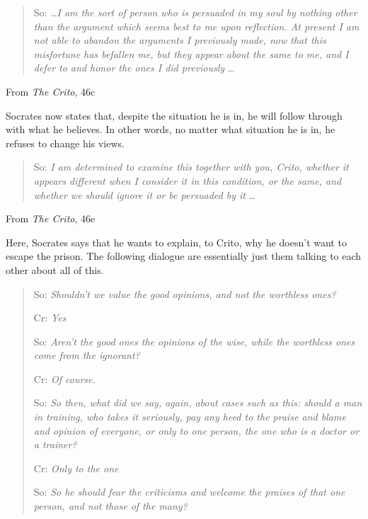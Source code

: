 \documentclass[letterpaper]{article}
\begin{document}
\begin{itemize}
    \begin{mdframed}[]
        \begin{quotation}
            So: \dots \emph{I am the sort of person who is persuaded in my soul by nothing other than the argument which seems best to me upon reflection. At present I am not able to abandon the arguments I previously made, now that this misfortune has befallen me, but they appear about the same to me, and I defer to and honor the ones I did previously} \dots
        \end{quotation}
        From \emph{The Crito}, 46c
    \end{mdframed}
    Socrates now states that, despite the situation he is in, he will follow through with what he believes. In other words, no matter what situation he is in, he refuses to change his views. 

    \begin{mdframed}[]
        \begin{quotation}
            So: \emph{I am determined to examine this together with you, Crito, whether it appears different when I consider it in this condition, or the same, and whether we should ignore it or be persuaded by it} \dots
        \end{quotation}
        From \emph{The Crito}, 46e
    \end{mdframed}
    Here, Socrates says that he wants to explain, to Crito, why he doesn't want to escape the prison. The following dialogue are essentially just them talking to each other about all of this. 

    \begin{mdframed}[]
        \begin{quotation}
            So: \emph{Shouldn't we value the good opinions, and not the worthless ones?} 
            
            Cr: \emph{Yes}

            So: \emph{Aren't the good ones the opinions of the wise, while the worthless ones come from the ignorant?}

            Cr: \emph{Of course.}

            So: \emph{So then, what did we say, again, about cases such as this: should a man in training, who takes it seriously, pay any heed to the praise and blame and opinion of everyone, or only to one person, the one who is a doctor or a trainer?}

            Cr: \emph{Only to the one}

            So: \emph{So he should fear the criticisms and welcome the praises of that one person, and not those of the many?}


\end{quotation}
\end{mdframed}
\end{itemize}
\end{document}
